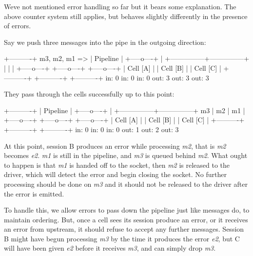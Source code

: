 We\textquotesingle{}ve not mentioned error handling so far but it bears some explanation. The above counter system still applies, but behaves slightly differently in the presence of errors.

Say we push three messages into the pipe in the outgoing direction\+:

\begin{DoxyVerb}                          +----------+
            m3, m2, m1 => | Pipeline |
                          +-----o----+
                                |
                +---------------+---------------+
                |               |               |
          +-----o----+    +-----o----+    +-----o----+
          | Cell [A] |    | Cell [B] |    | Cell [C] |
          +----------+    +----------+    +----------+
             in: 0           in: 0           in: 0
            out: 3          out: 3          out: 3
\end{DoxyVerb}


They pass through the cells successfully up to this point\+:

\begin{DoxyVerb}                          +----------+
                          | Pipeline |
                          +-----o----+
                                |
                +---------------+---------------+
            m3  |           m2  |           m1  |
          +-----o----+    +-----o----+    +-----o----+
          | Cell [A] |    | Cell [B] |    | Cell [C] |
          +----------+    +----------+    +----------+
             in: 0           in: 0           in: 0
            out: 1          out: 2          out: 3
\end{DoxyVerb}


At this point, session {\ttfamily B} produces an error while processing {\itshape m2}, that is {\itshape m2} becomes {\itshape e2}. {\itshape m1} is still in the pipeline, and {\itshape m3} is queued behind {\itshape m2}. What ought to happen is that {\itshape m1} is handed off to the socket, then {\itshape m2} is released to the driver, which will detect the error and begin closing the socket. No further processing should be done on {\itshape m3} and it should not be released to the driver after the error is emitted.

To handle this, we allow errors to pass down the pipeline just like messages do, to maintain ordering. But, once a cell sees its session produce an error, or it receives an error from upstream, it should refuse to accept any further messages. Session {\ttfamily B} might have begun processing {\itshape m3} by the time it produces the error {\itshape e2}, but {\ttfamily C} will have been given {\itshape e2} before it receives {\itshape m3}, and can simply drop {\itshape m3}.

